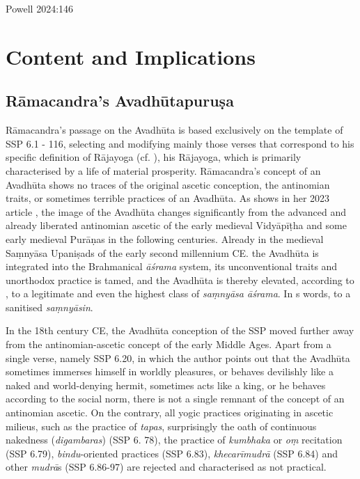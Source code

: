 Powell 2024:146

\chapter{Content and Implications}

\section{Rāmacandra's Avadhūtapuruṣa}
\label{avadhutapurusa} 

Rāmacandra's passage on the Avadhūta is based exclusively on the template of SSP 6.1 - 116, selecting and modifying mainly those verses that correspond to his specific definition of Rājayoga (cf. \pageref{intro}), his Rājayoga, which is primarily characterised by a life of material prosperity. Rāmacandra's concept of an Avadhūta shows no traces of the original ascetic conception, the antinomian traits, or sometimes terrible practices of an Avadhūta. As \citeauthor{pudi2023} shows in her 2023 article , the image of the Avadhūta changes significantly from the advanced and already liberated antinomian ascetic of the early medieval Vidyāpīṭha and some early medieval Purāṇas in the following centuries. Already in the medieval Saṃnyāsa Upaniṣads of the early second millennium CE. the Avadhūta is integrated into the Brahmanical \textit{āśrama} system, its unconventional traits and unorthodox practice is tamed, and the Avadhūta is thereby elevated, according to \citeauthor{pudi2023}, to a legitimate and even the highest class of \textit{saṃnyāsa āśrama}. In \citeauthor{pudi2023}s words, to a sanitised \textit{saṃnyāsin}.

In the 18th century CE, the Avadhūta conception of the SSP moved further away from the antinomian-ascetic concept of the early Middle Ages. Apart from a single verse, namely SSP 6.20, in which the author points out that the Avadhūta sometimes immerses himself in worldly pleasures, or behaves devilishly like a naked and world-denying hermit, sometimes acts like a king, or he behaves according to the social norm, there is not a single remnant of the concept of an antinomian ascetic. On the contrary, all yogic practices originating in ascetic milieus, such as the practice of \textit{tapas}, surprisingly the oath of continuous nakedness (\textit{digambaras}) (SSP 6. 78), the practice of \textit{kumbhaka} or \textit{oṃ} recitation (SSP 6.79), \textit{bindu}-oriented practices (SSP 6.83), \textit{khecarīmudrā} (SSP 6.84) and other \textit{mudrā}s (SSP 6.86-97) are rejected and characterised as not practical.

